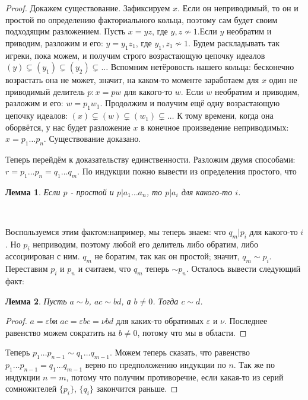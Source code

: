 \documentclass[a4paper,100pt]{article}
\theoremstyle{indented}
\newtheorem{lemma}{Лемма}
\theoremstyle{definition}
\theoremstyle{remark}
\begin{document}
\begin{proof}
    Докажем существование. Зафиксируем $x$. Если он неприводимый, то он и простой по определению факториального кольца, поэтому сам будет своим подходящим разложением. Пусть $x=yz$, где $y, z \nsim 1$.Если $y$ необратим и приводим, разложим и его: $y=y_1 z_1$, где $y_1, z_1 \nsim 1$. Будем раскладывать так игреки, пока можем, и получим строго возрастающую цепочку идеалов $(y)\subsetneq(y_1)\subsetneq(y_2)\subsetneq\dots$ Вспомним нетёровость нашего кольца: бесконечно возрастать она не может, значит, на каком-то моменте заработаем для $x$ один не приводимый делитель $p: x=pw$ для какого-то $w$. Если $w$ необратим и приводим, разложим и его: $w=p_1 w_1$. Продолжим и получим ещё одну возрастающую цепочку идеалов: $(x)\subsetneq (w)\subsetneq (w_1)\subsetneq \dots$ К тому времени, когда она оборвётся, у нас будет разложение $x$ в конечное произведение неприводимых: $x=p_1\dots p_n$. Существование доказано.\ 

    Теперь перейдём к доказательству единственности. Разложим двумя способами: $r=p_1\dots p_n=q_1\dots q_m$. По индукции пожно вывести из определения простого, что\\

    \begin{lemma}
        Если $p$ - простой и $p\vert a_1\dots a_n$, то $p\vert a_i$ для какого-то $i$.
    \end{lemma}\

    Воспользуемся этим фактом:например, мы теперь знаем: что $q_m\vert p_i$ для какого-то $i$. Но $p_i$ неприводим, поэтому любой его делитель либо обратим, либо ассоциирован с ним. $q_m$ не боратим, так как он простой; значит, $q_m \sim p_i$. Переставим $p_i$ и $p_n$ и считаем, что $q_m$ теперь $\sim p_n$. Осталось вывести следующий факт:\\

    \begin{lemma}
        Пусть $a\sim b$, $ac\sim bd$, а $b\neq 0$. Тогда $c\sim d$.
    \end{lemma}

    \begin{proof}
        $a=\varepsilon b$и $ac=\varepsilon bc =\nu bd$ для каких-то обратимых $\varepsilon$ и $\nu$. Последнее равенство можем сократить на $b\neq 0$, потому что мы в области.
    \end{proof}

    Теперь $p_1\dots p_{n-1}\sim q_1\dots q_{m-1}$. Можем теперь сказать, что равенство $p_1\dots p_{n-1} = q_1\dots q_{m-1}$ верно по предположению индукции по $n$. Так же по индукции $n=m$, потому что получим противоречие, если какая-то из серий сомножителей $\{p_i\}$, $\{q_i\}$ закончится раньше.
\end{proof}
\end{document}

